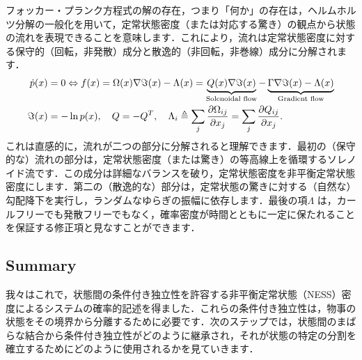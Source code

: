 \documentclass[a4paper, titlepage]{jsarticle}
\begin{document}
\par
フォッカー・プランク方程式の解の存在，つまり「何か」の存在は，ヘルムホルツ分解の一般化を用いて，定常状態密度（または対応する驚き）の観点から状態の流れを表現できることを意味します．これにより，流れは定常状態密度に対する保守的（回転，非発散）成分と散逸的（非回転，非巻線）成分に分解されます．
\begin{equation}\label{Helmholtz_decomposition}
    \begin{aligned}
        \dot{p}(x) &= 0 \Leftrightarrow f(x) = \Omega(x)\nabla \imaginary(x) - \Lambda(x) = \underbrace{Q(x)\nabla \imaginary(x)}_{\text{Solenoidal flow}} - \underbrace{\Gamma \nabla \imaginary(x) - \Lambda(x)}_{\text{Gradient flow}} \\
        \imaginary(x) &= -\ln p(x), \quad Q = -Q^T, \quad \Lambda_i \triangleq \sum_j \frac{\partial \Omega_{ij}}{\partial x_j} = \sum_j \frac{\partial Q_{ij}}{\partial x_j}.
    \end{aligned}
\end{equation}
これは直感的に，流れが二つの部分に分解されると理解できます．最初の（保守的な）流れの部分は，定常状態密度（または驚き）の等高線上を循環するソレノイド流です．この成分は詳細なバランスを破り，定常状態密度を非平衡定常状態密度にします．第二の（散逸的な）部分は，定常状態の驚きに対する（自然な）勾配降下を実行し，ランダムなゆらぎの振幅に依存します．最後の項$\Lambda$ は，カールフリーでも発散フリーでもなく，確率密度が時間とともに一定に保たれることを保証する修正項と見なすことができます．
\subsection{Summary}
我々はこれで，状態間の条件付き独立性を許容する非平衡定常状態（NESS）密度によるシステムの確率的記述を得ました．これらの条件付き独立性は，物事の状態をその境界から分離するために必要です．次のステップでは，状態間のまばらな結合から条件付き独立性がどのように継承され，それが状態の特定の分割を確立するためにどのように使用されるかを見ていきます．
\end{document}
